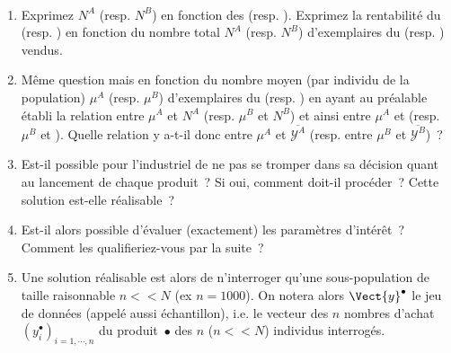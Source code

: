 \documentclass[10pt]{report}
\begin{document}
\newpage\begin{exercice}${ }$

\begin{enumerate}
\item Exprimez $N^A$ (resp. $N^B$) en fonction des  \POP[A] (resp. \POP[B]). Exprimez la rentabilité du  (resp. ) en fonction du nombre total $N^A$ (resp. $N^B$) d'exemplaires du  (resp. ) vendus.


\item Même question mais en fonction du nombre moyen (par individu de la population) $\mu^A$ (resp. $\mu^B$) d'exemplaires du  (resp. ) en ayant au préalable établi la relation entre $\mu^A$ et $N^A$ (resp. $\mu^B$ et $N^B$) et ainsi entre $\mu^A$ et \POP[A] (resp. $\mu^B$ et \POP[B]). Quelle relation y a-t-il donc entre $\mu^A$ et $\overline{\mathcal{Y}^A}$ (resp. entre $\mu^B$ et $\overline{\mathcal{Y}^B}$)~?\\
\centerline{}


\item Est-il possible pour l'industriel de ne pas se tromper dans sa décision quant au lancement de chaque produit~? Si oui, comment doit-il procéder~? Cette solution est-elle réalisable~? 


\item Est-il alors possible d'évaluer (exactement) les paramètres d'intérêt~? Comment les qualifieriez-vous par la suite~?


\item Une solution r{\'e}alisable est alors de n'interroger qu'une sous-population de taille raisonnable $n<<N$ (ex $n=1000$). On notera alors $\Vect{y}^\bullet$ le jeu de données (appelé aussi échantillon), i.e. le vecteur des $n$ nombres d'achat $\left(y_i^\bullet\right)_{i=1,\cdots,n}$ du produit~$\bullet$ des $n$ ($n<<N$) individus interrogés.
 



\end{enumerate}
\end{exercice}
\end{document}
